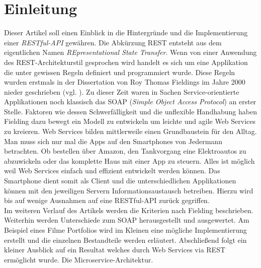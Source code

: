 \documentclass[fleqn,10.5pt,ngerman]{SelfArx}
\affiliation{\textit{Hochschule Kaiserslautern}} %
\affiliation{\textbf{Corresponding author}: fesc0013@stud.hs-kl.de} %
\newlength{\tocsep}
\begin{document}
\flushbottom %

\maketitle %

\tableofcontents %

\thispagestyle{empty} %


\section*{Einleitung} %

Dieser Artikel soll einen Einblick in die Hintergründe und die Implementierung einer \textit{RESTful-API} gewähren. Die Abkürzung REST entsteht aus dem eigentlichen Namen \textit{REpresentational State Transfer}. Wenn von einer Anwendung des REST-Architekturstil gesprochen wird handelt es sich um eine Applikation die unter gewissen Regeln definiert und programmiert wurde. Diese Regeln wurden erstmals in der Dissertation von Roy Thomas Fieldings im Jahre 2000 nieder geschrieben (vgl. \cite{Fielding:2000}). Zu dieser Zeit waren in Sachen Service-orientierte Applikationen noch klassisch das SOAP (\textit{Simple Object Access Protocol}) an erster Stelle. Faktoren wie dessen Schwerfälligkeit und die unflexible Handhabung haben Fielding dazu bewegt ein Modell zu entwickeln um leichte und agile Web Services zu kreieren. Web Services bilden mittlerweile einen Grundbaustein für den Alltag. Man muss sich nur mal die Apps auf den Smartphones von Jedermann betrachten. Ob bestellen über Amazon, den Tankvorgang eine Elektroautos zu abzuwickeln oder das komplette Haus mit einer App zu steuern. Alles ist möglich weil Web Services einfach und effizient entwickelt werden können. Das Smartphone dient somit als Client und die unterschiedlichen Applikationen können mit den jeweiligen Servern Informationsaustausch betreiben. Hierzu wird bis auf wenige Ausnahmen auf eine RESTful-API zurück gegriffen. \\ Im weiteren Verlauf des Artikels werden die Kriterien nach Fielding beschrieben. Weiterhin werden Unterschiede zum SOAP herausgestellt und ausgewertet. Am Beispiel eines Filme Portfolios wird im Kleinen eine mögliche Implementierung erstellt und die einzelnen Bestandteile werden erläutert. Abschließend folgt ein kleiner Ausblick auf ein Resultat welches durch Web Services via REST ermöglicht wurde. Die Microservice-Architektur.
\end{document}
